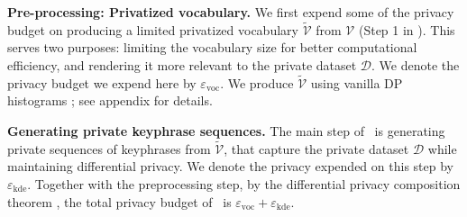 \noindent\textbf{Pre-processing: Privatized vocabulary.}
We first expend some of the privacy budget on producing a limited privatized vocabulary $\widetilde{\mathcal{V}}$ from $\mathcal{V}$ (Step 1 in ). This serves two purposes: limiting the vocabulary size for better computational efficiency, and rendering it more relevant to the private dataset $\mathcal{D}$. We denote the privacy budget we expend here by $\varepsilon_{\mathrm{voc}}$.
%
We produce $\widetilde{\mathcal{V}}$ using vanilla DP histograms \cite{dwork2014algorithmic}; see appendix for details.

\noindent\textbf{Generating private keyphrase sequences.}
The main step of \alg\ is generating private sequences of keyphrases from $\widetilde{\mathcal{V}}$, that capture the private dataset $\mathcal{D}$ while maintaining differential privacy. 
We denote the privacy expended on this step by $\varepsilon_{\mathrm{kde}}$. Together with the preprocessing step, by the differential privacy composition theorem \cite{dwork2014algorithmic}, the total privacy budget of \alg\ is $\varepsilon_{\mathrm{voc}}+\varepsilon_{\mathrm{kde}}$.

